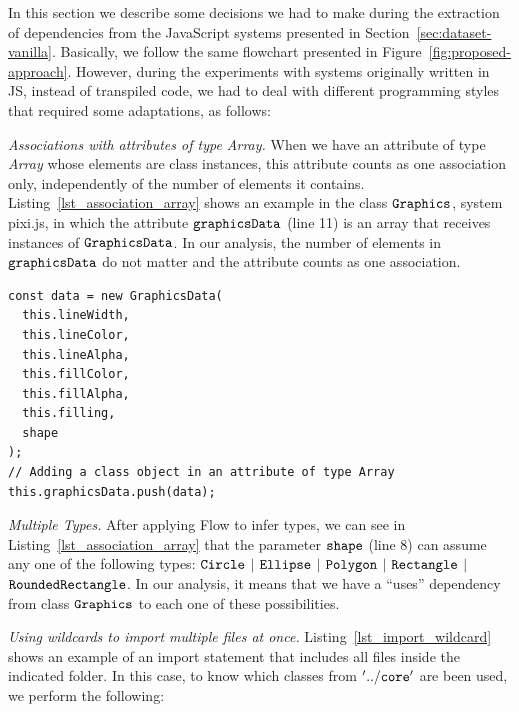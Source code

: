 \documentclass[review]{elsarticle}
\newcommand{\aspas}[1]{{``#1''}}
\newcommand{\mcode}[1]{$\tt #1$}
\begin{document}
In this section we describe some decisions we had to make during the extraction of dependencies from the JavaScript systems presented in Section~\ref{sec:dataset-vanilla}. Basically, we follow the same flowchart presented in Figure~\ref{fig:proposed-approach}. However, during the experiments with systems originally written in JS, instead of transpiled code, we had to deal with different programming styles that required some adaptations, as follows: 

\vspace{2.0 mm}

\noindent \textit{Associations with attributes of type Array.} When we have an attribute of type \textit{Array} whose elements are class instances, this attribute counts as one association only, independently of the number of elements it contains. Listing~\ref{lst_association_array} shows an example in the class \mcode{Graphics}, system {\sc pixi.js}, in which the attribute \mcode{graphicsData} (line 11) is an array that receives instances of \mcode{GraphicsData}. In our analysis, the number of elements in \mcode{graphicsData} do not matter and the attribute counts as one association.

\begin{lstlisting}[caption=Example of association in class \mcode{Graphics} in system {\sc pixi.js}, label=lst_association_array, emph={[2]graphicsData},emphstyle={[2]\ttfamily\bfseries\color{darkgreen}}]
const data = new GraphicsData(
  this.lineWidth,
  this.lineColor,
  this.lineAlpha,
  this.fillColor,
  this.fillAlpha,
  this.filling,
  shape
);
// Adding a class object in an attribute of type Array
this.graphicsData.push(data);

\end{lstlisting} 

\vspace{1.0 mm}

\noindent \textit{Multiple Types.} After applying Flow to infer types, we can see in Listing~\ref{lst_association_array} that the parameter \mcode{shape} (line 8) can assume any one of the following types:  \mcode{Circle} $\vert$ \mcode{Ellipse} $\vert$ \mcode{Polygon} $\vert$ \mcode{Rectangle} $\vert$ \mcode{RoundedRectangle}. In our analysis, it means that we have a \aspas{uses} dependency from class \mcode{Graphics} to each one of these possibilities.

\vspace{2.5 mm}

\noindent \textit{Using wildcards to import multiple files at once.} Listing~\ref{lst_import_wildcard} shows an example of an import statement that includes all files inside the indicated folder. In this case, to know which classes from \mcode{'../core'} are been used, we perform the following:
\end{document}
